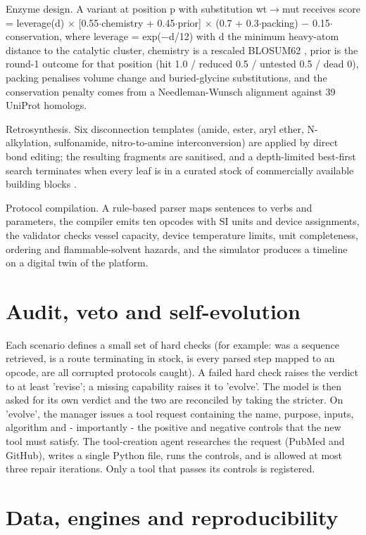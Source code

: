 Enzyme design. A variant at position p with substitution wt$\rightarrow$mut receives score = leverage(d) $\times$ [0.55$\cdot$chemistry + 0.45$\cdot$prior] $\times$ (0.7 + 0.3$\cdot$packing) − 0.15$\cdot$conservation, where leverage = exp(−d/12) with d the minimum heavy-atom distance to the catalytic cluster, chemistry is a rescaled BLOSUM62 \cite{r15}, prior is the round-1 outcome for that position (hit 1.0 / reduced 0.5 / untested 0.5 / dead 0), packing penalises volume change and buried-glycine substitutions, and the conservation penalty comes from a Needleman-Wunsch alignment against 39 UniProt homologs.

Retrosynthesis. Six disconnection templates (amide, ester, aryl ether, N-alkylation, sulfonamide, nitro-to-amine interconversion) are applied by direct bond editing; the resulting fragments are sanitised, and a depth-limited best-first search terminates when every leaf is in a curated stock of commercially available building blocks \cite{r18,r20}.

Protocol compilation. A rule-based parser maps sentences to verbs and parameters, the compiler emits ten opcodes with SI units and device assignments, the validator checks vessel capacity, device temperature limits, unit completeness, ordering and flammable-solvent hazards, and the simulator produces a timeline on a digital twin of the platform.

\section{Audit, veto and self-evolution}

Each scenario defines a small set of hard checks (for example: was a sequence retrieved, is a route terminating in stock, is every parsed step mapped to an opcode, are all corrupted protocols caught). A failed hard check raises the verdict to at least 'revise'; a missing capability raises it to 'evolve'. The model is then asked for its own verdict and the two are reconciled by taking the stricter. On 'evolve', the manager issues a tool request containing the name, purpose, inputs, algorithm and - importantly - the positive and negative controls that the new tool must satisfy. The tool-creation agent researches the request (PubMed and GitHub), writes a single Python file, runs the controls, and is allowed at most three repair iterations. Only a tool that passes its controls is registered.

\section{Data, engines and reproducibility}

